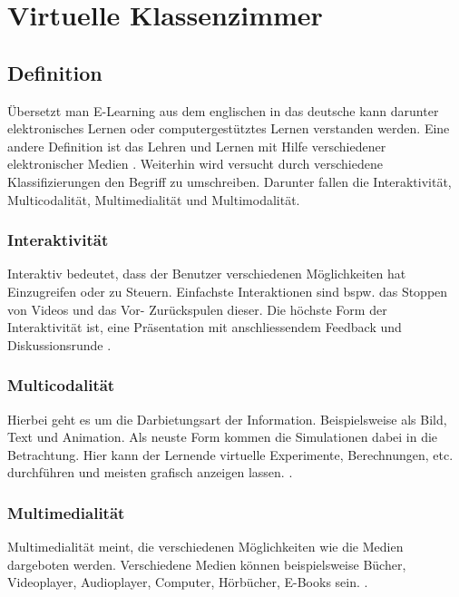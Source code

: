 \chapter{Virtuelle Klassenzimmer}

\section{Definition}
Übersetzt man E-Learning aus dem englischen in das deutsche kann darunter  \glqq elektronisches Lernen\grqq{} oder \glqq computergestütztes Lernen\grqq{} verstanden werden. Eine andere Definition ist \glqq das Lehren und Lernen mit Hilfe verschiedener elektronischer Medien\grqq{} \cite[vgl.][]{elearning}. \newline
\newline Weiterhin wird versucht durch verschiedene Klassifizierungen den Begriff zu umschreiben. Darunter fallen die Interaktivität, Multicodalität, Multimedialität und Multimodalität.

\subsection{Interaktivität} 
		 Interaktiv bedeutet, dass der Benutzer verschiedenen Möglichkeiten hat Einzugreifen oder zu Steuern. Einfachste Interaktionen sind bspw. das Stoppen von Videos und das Vor- Zurückspulen dieser. Die höchste Form der Interaktivität ist, eine Präsentation mit anschliessendem Feedback und Diskussionsrunde \cite[vgl.][]{elearning.interaktivitaet}. 
\subsection{Multicodalität}
		 Hierbei geht es um die Darbietungsart der Information. Beispielsweise als Bild, Text und Animation. Als neuste Form kommen die Simulationen dabei in die Betrachtung. Hier kann der Lernende virtuelle Experimente, Berechnungen, etc. durchführen und meisten grafisch anzeigen lassen.  \cite[vgl.][]{elearning.multicodalitaet2}. 
\subsection{Multimedialität}
		 Multimedialität meint, die verschiedenen Möglichkeiten wie die Medien dargeboten werden. Verschiedene Medien können beispielsweise Bücher, Videoplayer, Audioplayer, Computer, Hörbücher, E-Books sein.  \cite[vgl.][]{elearning.multimedialitaet2}. \newline  \newline

